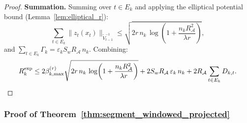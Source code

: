 \documentclass{article}
\newcommand{\cA}{\mathcal{A}}
\begin{document}
\begin{proof}
\textbf{Summation.}
Summing over $t \in E_k$ and applying the elliptical potential bound (Lemma~\ref{lem:elliptical_r}):
\[
\sum_{t \in E_k} \|z_t(x_t)\|_{\widetilde V_{t-1}^{-1}} \le \sqrt{2r\,n_k\,\log\!\left(1 + \frac{n_k R_{\cA}^2}{\lambda r}\right)},
\]
and $\sum_{t \in E_k} \Gamma_k = \varepsilon_k S_w R_{\cA}\,n_k$.  Combining:
\[
R_k^{\mathrm{exp}} \le 2\beta_{k,\max}^{(r)} \sqrt{2r\,n_k\,\log\!\left(1+\frac{n_k R_{\cA}^2}{\lambda r}\right)} + 2S_w R_{\cA}\,\varepsilon_k\,n_k + 2R_{\cA}\sum_{t \in E_k} D_{k,t}. \qedhere
\]
\end{proof}

\subsubsection{Proof of Theorem~\ref{thm:segment_windowed_projected}}
\label{proof:segment_windowed_projected}
\end{document}
